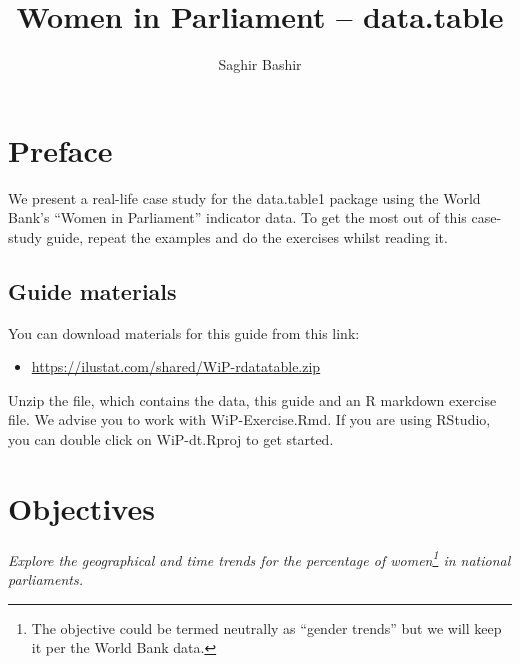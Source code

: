 \documentclass[a4paper,9pt,twocolumn,twoside,printwatermark=true]{pinp}
\title{Women in Parliament -- data.table}
\author[]{Saghir Bashir}
\providecommand{\tightlist}{%
  \setlength{\itemsep}{0pt}\setlength{\parskip}{0pt}}
\begin{document}
\verticaladjustment{-2pt}

\maketitle
\thispagestyle{firststyle}



\section{Preface}\label{preface}

We present a real-life case study for the data.table1 package using the
World Bank's ``Women in Parliament'' indicator data. To get the most out
of this case-study guide, repeat the examples and do the exercises
whilst reading it.

\subsection{Guide materials}\label{guide-materials}

You can download materials for this guide from this link:

\begin{itemize}
\tightlist
\item
  \url{https://ilustat.com/shared/WiP-rdatatable.zip}
\end{itemize}

Unzip the file, which contains the data, this guide and an R markdown
exercise file. We advise you to work with WiP-Exercise.Rmd. If you are
using RStudio, you can double click on WiP-dt.Rproj to get started.

\section{Objectives}\label{objectives}

\emph{Explore the geographical and time trends for the percentage of
women\footnote{The objective could be termed neutrally as ``gender
  trends'' but we will keep it per the World Bank data.} in national
parliaments.}
\end{document}

